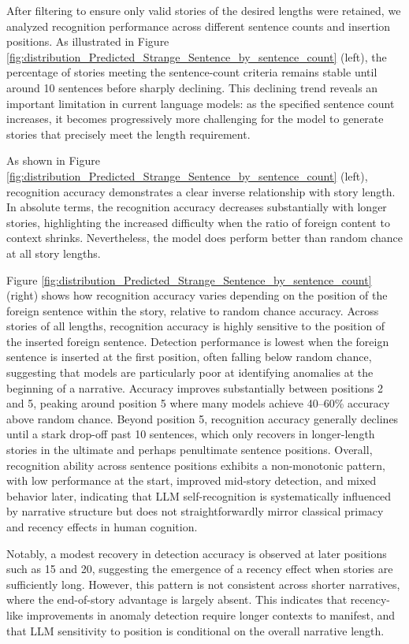 \documentclass{article}
\begin{document}
After filtering to ensure only valid stories of the desired lengths were retained, we analyzed recognition performance across different sentence counts and insertion positions. As illustrated in Figure \ref{fig:distribution_Predicted_Strange_Sentence_by_sentence_count} (left), the percentage of stories meeting the sentence-count criteria remains stable until around 10 sentences before sharply declining. This declining trend reveals an important limitation in current language models: as the specified sentence count increases, it becomes progressively more challenging for the model to generate stories that precisely meet the length requirement.

As shown in Figure \ref{fig:distribution_Predicted_Strange_Sentence_by_sentence_count} (left), recognition accuracy demonstrates a clear inverse relationship with story length. In absolute terms, the recognition accuracy decreases substantially with longer stories, highlighting the increased difficulty when the ratio of foreign content to context shrinks. Nevertheless, the model does perform better than random chance at all story lengths.

Figure \ref{fig:distribution_Predicted_Strange_Sentence_by_sentence_count} (right) shows how recognition accuracy varies depending on the position of the foreign sentence within the story, relative to random chance accuracy. Across stories of all lengths, recognition accuracy is highly sensitive to the position of the inserted foreign sentence. Detection performance is lowest when the foreign sentence is inserted at the first position, often falling below random chance, suggesting that models are particularly poor at identifying anomalies at the beginning of a narrative. Accuracy improves substantially between positions 2 and 5, peaking around position 5 where many models achieve 40–60\% accuracy above random chance. Beyond position 5, recognition accuracy generally declines until a stark drop-off past 10 sentences, which only recovers in longer-length stories in the ultimate and perhaps penultimate sentence positions. Overall, recognition ability across sentence positions exhibits a non-monotonic pattern, with low performance at the start, improved mid-story detection, and mixed behavior later, indicating that LLM self-recognition is systematically influenced by narrative structure but does not straightforwardly mirror classical primacy and recency effects in human cognition.

Notably, a modest recovery in detection accuracy is observed at later positions such as 15 and 20, suggesting the emergence of a recency effect when stories are sufficiently long. However, this pattern is not consistent across shorter narratives, where the end-of-story advantage is largely absent. This indicates that recency-like improvements in anomaly detection require longer contexts to manifest, and that LLM sensitivity to position is conditional on the overall narrative length.
\end{document}
